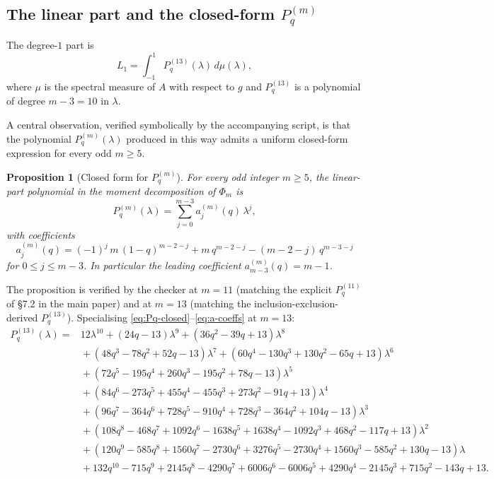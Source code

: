 \documentclass[11pt]{article}
\newtheorem{proposition}[theorem]{Proposition}
\begin{document}
\subsection{The linear part and the closed-form $P_q^{(m)}$}

The degree-$1$ part is
\[
        L_1 = \int_{-1}^{1} P_q^{(13)}(\lambda)\, d\mu(\lambda),
\]
where $\mu$ is the spectral measure of $A$ with respect to $g$ and $P_q^{(13)}$ is a polynomial of degree $m - 3 = 10$ in $\lambda$.

A central observation, verified symbolically by the accompanying script, is that the polynomial $P_q^{(m)}(\lambda)$ produced in this way admits a uniform closed-form expression for every odd $m \ge 5$.

\begin{proposition}[Closed form for $P_q^{(m)}$]\label{prop:Pq-closed}
For every odd integer $m \ge 5$, the linear-part polynomial in the moment decomposition of $\Phi_m$ is
\begin{equation}\label{eq:Pq-closed}
        P_q^{(m)}(\lambda) = \sum_{j=0}^{m-3} a_j^{(m)}(q)\, \lambda^j,
\end{equation}
with coefficients
\begin{equation}\label{eq:a-coeffs}
        a_j^{(m)}(q)
        = (-1)^j\, m\, (1-q)^{m-2-j}
        + m\, q^{m-2-j}
        - (m-2-j)\, q^{m-3-j}
\end{equation}
for $0 \le j \le m - 3$.  In particular the leading coefficient $a_{m-3}^{(m)}(q) = m - 1$.
\end{proposition}

The proposition is verified by the checker at $m = 11$ (matching the explicit $P_q^{(11)}$ of \S 7.2 in the main paper) and at $m = 13$ (matching the inclusion-exclusion-derived $P_q^{(13)}$).  Specialising \eqref{eq:Pq-closed}--\eqref{eq:a-coeffs} at $m = 13$:
\begin{align*}
P_q^{(13)}(\lambda)
={}& 12\lambda^{10} + (24q - 13)\lambda^9 + (36q^2 - 39q + 13)\lambda^8 \\
&{}+ (48q^3 - 78q^2 + 52q - 13)\lambda^7 + (60q^4 - 130q^3 + 130q^2 - 65q + 13)\lambda^6 \\
&{}+ (72q^5 - 195q^4 + 260q^3 - 195q^2 + 78q - 13)\lambda^5 \\
&{}+ (84q^6 - 273q^5 + 455q^4 - 455q^3 + 273q^2 - 91q + 13)\lambda^4 \\
&{}+ (96q^7 - 364q^6 + 728q^5 - 910q^4 + 728q^3 - 364q^2 + 104q - 13)\lambda^3 \\
&{}+ (108q^8 - 468q^7 + 1092q^6 - 1638q^5 + 1638q^4 - 1092q^3 + 468q^2 - 117q + 13)\lambda^2 \\
&{}+ (120q^9 - 585q^8 + 1560q^7 - 2730q^6 + 3276q^5 - 2730q^4 + 1560q^3 - 585q^2 + 130q - 13)\lambda \\
&{}+ 132q^{10} - 715q^9 + 2145q^8 - 4290q^7 + 6006q^6 - 6006q^5 + 4290q^4 - 2145q^3 + 715q^2 - 143q + 13.
\end{align*}
\end{document}

